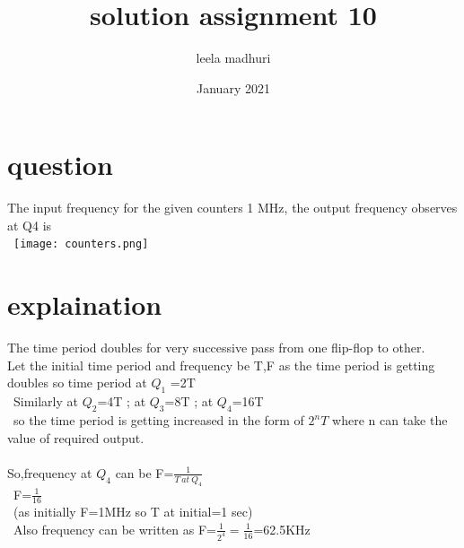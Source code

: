 \documentclass{article}
\title{solution assignment 10}
\author{leela madhuri}
\date{January 2021}
\begin{document}
\maketitle

\section{question}
The input frequency for the given counters 1 MHz, the output frequency observes at Q4 is \\\
\texttt{[image: counters.png]}\\
\section{explaination}
The time period doubles for very successive pass from one flip-flop to other.\\
  Let the initial time period and frequency be T,F as the time period is getting doubles so
  time period at $Q_1$ =2T\\\
  Similarly at $Q_2$=4T ; at $Q_3$=8T ; at $Q_4$=16T\\\
so the time period is getting increased in the form of $2^{n}T$ where n can take the value of required output.\\\\
So,frequency at $Q_4$ can be F=$\frac{1}{T \  at \  Q_4 }$\\\
F=$\frac{1}{16}$\\\ {(as initially F=1MHz so T at initial=1 sec)}\\\
Also frequency can be written as F=$\frac{1}{2^4}=\frac{1}{16}$=62.5KHz
\end{document}
